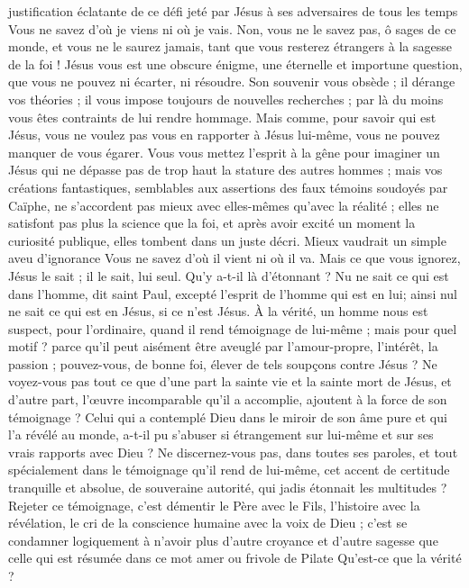 justification éclatante de ce défi jeté par Jésus à ses adversaires de tous les temps\frcolon{} \Og{} Vous ne savez d’où je viens ni où je vais.\Fg{} Non, vous ne le savez pas, ô sages de ce monde, et vous ne le saurez jamais, tant que vous resterez étrangers à la sagesse de la foi ! Jésus vous est une obscure énigme, une éternelle et importune question, que vous ne pouvez ni écarter, ni résoudre. Son souvenir vous obsède ; il dérange vos théories ; il vous impose toujours de nouvelles recherches ; par là du moins vous êtes contraints de lui rendre hommage. Mais comme, pour savoir qui est Jésus, vous ne voulez pas vous en rapporter à Jésus lui-même, vous ne pouvez manquer de vous égarer. Vous vous mettez l’esprit à la gêne pour imaginer un Jésus qui ne dépasse pas de trop haut la stature des autres hommes ; mais vos créations fantastiques, semblables aux assertions des faux témoins soudoyés par Caïphe, ne s’accordent pas mieux avec elles-mêmes qu’avec la réalité ; elles ne satisfont pas plus la science que la foi, et après avoir excité un moment la curiosité publique, elles tombent dans un juste décri. Mieux vaudrait un simple aveu d’ignorance\frcolon{} Vous ne savez d’où il vient ni où il va. Mais ce que vous ignorez, Jésus le sait ; il le sait, lui seul. Qu’y a-t-il là d’étonnant ? \Og{} Nu ne sait ce qui est dans l’homme, dit saint Paul, excepté l’esprit de l’homme qui est en lui\Fg{}; ainsi nul ne sait ce qui est en Jésus, si ce n’est Jésus. À la vérité, un homme nous est suspect, pour l’ordinaire, quand il rend témoignage de lui-même ; mais pour quel motif ? parce qu’il peut aisément être aveuglé par l’amour-propre, l’intérêt, la passion ; pouvez-vous, de bonne foi, élever de tels soupçons contre Jésus ? Ne voyez-vous pas tout ce que d’une part la sainte vie et la sainte mort de Jésus, et d’autre part, l’œuvre incomparable qu’il a accomplie, ajoutent à la force de son témoignage ? Celui qui a contemplé Dieu dans le miroir de son âme pure et qui l’a révélé au monde, a-t-il pu s’abuser si étrangement sur lui-même et sur ses vrais rapports avec Dieu ? Ne discernez-vous pas, dans toutes ses paroles, et tout spécialement dans le témoignage qu’il rend de lui-même, cet accent de certitude tranquille et absolue, de souveraine autorité, qui jadis étonnait les multitudes ? Rejeter ce témoignage, c’est démentir le Père avec le Fils, l’histoire avec la révélation, le cri de la conscience humaine avec la voix de Dieu ; c’est se condamner logiquement à n’avoir plus d’autre croyance et d’autre sagesse que celle qui est résumée dans ce mot amer ou frivole de Pilate\frcolon{} \Og{} Qu’est-ce que la vérité ?\Fg{}

